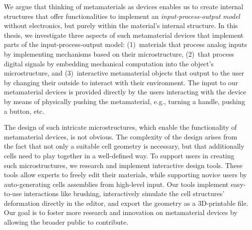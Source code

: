 We argue that thinking of metamaterials as devices enables us to create internal structures that offer functionalities to implement an \textit{input-process-output model} without electronics, but purely within the material’s internal structure. 
In this thesis, we investigate three aspects of such metamaterial devices that implement parts of the input-process-output model: 
(1)~materials that process analog inputs by implementing mechanisms based on their microstructure, 
(2)~that process digital signals by embedding mechanical computation into the object’s microstructure, and 
(3)~interactive metamaterial objects that output to the user by changing their outside to interact with their environment. 
The input to our metamaterial devices is provided directly by the users interacting with the device by means of physically pushing the metamaterial, e.g., turning a handle, pushing a button, etc. 

The design of such intricate microstructures, which enable the functionality of metamaterial devices, is not obvious. The complexity of the design arises from the fact that not only a suitable cell geometry is necessary, but that additionally cells need to play together in a well-defined way. 
To support users in creating such microstructures, we research and implement interactive design tools. 
These tools allow experts to freely edit their materials, while supporting novice users by auto-generating cells assemblies from high-level input. 
Our tools implement easy-to-use interactions like brushing, interactively simulate the cell structures’ deformation directly in the editor, and export the geometry as a 3D-printable file. 
Our goal is to foster more research and innovation on metamaterial devices by allowing the broader public to contribute.






